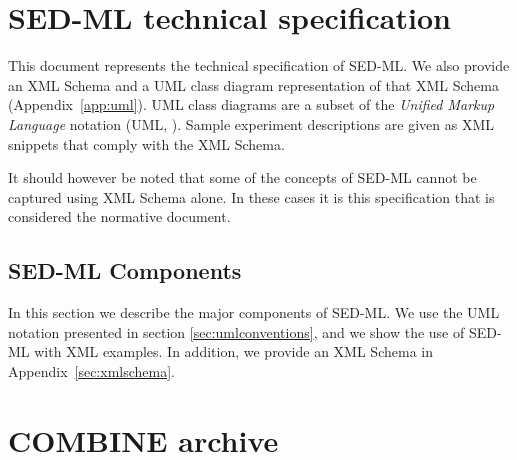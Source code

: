 \documentclass[pdftex,rgb,dvipsnames,svgnames,hyperref,table]{report}
\begin{document}

\tableofcontents
\newpage


\chapter{SED-ML technical specification}
\label{chp:specification}

This document represents the technical specification of SED-ML. We also provide an XML Schema \citep{xmls} and a UML class diagram representation of that XML Schema (Appendix~\ref{app:uml}). UML class diagrams are a subset of the \emph{Unified Markup Language} notation (UML, \citep{uml22}). Sample experiment descriptions are given as XML snippets that comply with the XML Schema.

It should however be noted that some of the concepts of SED-ML cannot be captured using XML Schema alone. In these cases it is this specification that is considered the normative document. 








\section{SED-ML Components}
In this section we describe the major components of SED-ML. We use the UML notation presented in section \ref{sec:umlconventions}, and we show the use of SED-ML with XML examples. In addition, we provide an XML Schema in Appendix~\ref{sec:xmlschema}.









\chapter{COMBINE archive}
\label{app:archive}
\end{document}
